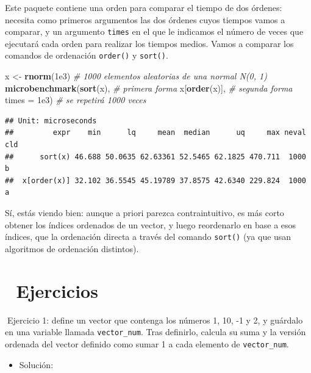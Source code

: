 \documentclass[11pt,]{book}
\newenvironment{Shaded}{\begin{snugshade}}{\end{snugshade}}
\newcommand{\CommentTok}[1]{\textcolor[rgb]{0.37,0.37,0.37}{\textit{#1}}}
\newcommand{\DataTypeTok}[1]{\textcolor[rgb]{0.27,0.27,0.27}{#1}}
\newcommand{\FloatTok}[1]{\textcolor[rgb]{0.06,0.06,0.06}{#1}}
\newcommand{\KeywordTok}[1]{\textcolor[rgb]{0.27,0.27,0.27}{\textbf{#1}}}
\newcommand{\NormalTok}[1]{#1}
\newcommand{\StringTok}[1]{\textcolor[rgb]{0.5,0.5,0.5}{#1}}
\providecommand{\tightlist}{%
  \setlength{\itemsep}{0pt}\setlength{\parskip}{0pt}}
\begin{document}
Este paquete contiene una orden para comparar el tiempo de dos órdenes: necesita como primeros argumentos las dos órdenes cuyos tiempos vamos a comparar, y un argumento \texttt{times} en el que le indicamos el número de veces que ejecutará cada orden para realizar los tiempos medios. Vamos a comparar los comandos de ordenación \texttt{order()} y \texttt{sort()}.

\begin{Shaded}
\begin{Highlighting}[]
\NormalTok{x <-}\StringTok{ }\KeywordTok{rnorm}\NormalTok{(}\FloatTok{1e3}\NormalTok{) }\CommentTok{# 1000 elementos aleatorias de una normal N(0, 1)}
\KeywordTok{microbenchmark}\NormalTok{(}\KeywordTok{sort}\NormalTok{(x), }\CommentTok{# primera forma}
\NormalTok{               x[}\KeywordTok{order}\NormalTok{(x)], }\CommentTok{# segunda forma}
               \DataTypeTok{times =} \FloatTok{1e3}\NormalTok{) }\CommentTok{# se repetirá 1000 veces}
\end{Highlighting}
\end{Shaded}

\begin{verbatim}
## Unit: microseconds
##         expr    min      lq     mean  median      uq     max neval cld
##      sort(x) 46.688 50.0635 62.63361 52.5465 62.1825 470.711  1000   b
##  x[order(x)] 32.102 36.5545 45.19789 37.8575 42.6340 229.824  1000  a
\end{verbatim}

Sí, estás viendo bien: aunque a priori parezca contraintuitivo, es más corto obtener los índices ordenados de un vector, y luego reordenarlo en base a esos índices, que la ordenación directa a través del comando \texttt{sort()} (ya que usan algoritmos de ordenación distintos).

\hypertarget{ejercicios-1}{%
\section{📝 Ejercicios}\label{ejercicios-1}}

📝Ejercicio 1: define un vector que contenga los números 1, 10, -1 y 2, y guárdalo en una variable llamada \texttt{vector\_num}. Tras definirlo, calcula su suma y la versión ordenada del vector definido como sumar 1 a cada elemento de \texttt{vector\_num}.

\begin{itemize}
\tightlist
\item
  Solución:
\end{itemize}
\end{document}
